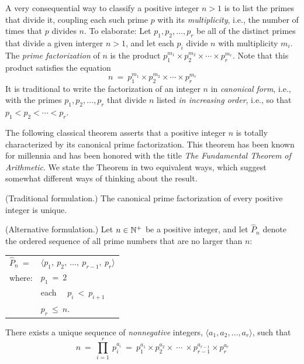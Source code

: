 A very consequential way to classify a positive integer $n >1$ is to list the primes that divide it, coupling each such prime $p$ with its {\it multiplicity}, i.e., the number of times that $p$ divides $n$.  To elaborate: Let $p_1, p_2, \ldots, p_r$ be all of the distinct primes that divide a given interger $n >1$, and let each $p_i$ divide $n$ with multiplicity $m_i$.  The {\it prime factorization} of $n$ is the product $p_1^{m_1} \times p_2^{m_2} \times \cdots \times p_r^{m_r}$.  Note that this product satisfies the equation
\begin{equation}
\label{eq:prime-factorization}
n \ = \ p_1^{m_1} \times p_2^{m_2} \times \cdots \times p_r^{m_r}
\end{equation}
It is traditional to write the factorization of an integer $n$ in {\it canonical form}, i.e., with the primes $p_1, p_2, \ldots, p_r$ that divide $n$ listed {\em in increasing order}, i.e., so that $p_1 < p_2 < \cdots < p_r$.

\medskip

The following classical theorem asserts that a positive integer $n$ is totally characterized by its canonical prime factorization.  This theorem has been known for millennia and has been honored with the title {\em The Fundamental Theorem of Arithmetic}.  We state the Theorem in two equivalent ways, which suggest somewhat different ways of thinking about the result.

\begin{theorem}
\label{thm:Fund-Thm-Arith}

\noindent
{\rm (Traditional formulation.)}
%
The canonical prime factorization of every positive integer is unique.

\medskip

\noindent
{\rm (Alternative formulation.)}
%
Let $n \in \mathbb{N}^+$ be a positive integer, and let $\widehat{P}_n$ denote the ordered sequence of all prime numbers that are no larger than $n$:

\smallskip

\begin{tabular}{ll}
$\widehat{P}_n \ =$  & $\langle p_1, \ p_2, \ \ldots, \ p_{r-1}, \ p_r \rangle$ \\
where:               & $p_1 \ = \ 2$ \\
                          & each  \ \ $p_i \ < \ p_{i+1}$ \\
                          & $p_r \ \leq \ n$.
\end{tabular}

\smallskip

\noindent
There exists a unique sequence of {\em nonnegative} integers, $\langle a_1, a_2, \ldots, a_r \rangle$, such that
\[
n \ = \ \prod_{i=1}^r \ p_i^{a_i} \ = \
p_1^{a_1} \times p_2^{a_2} \times \ \cdots \ \times p_{r-1}^{a_{r-1}} \times p_r^{a_r}
\]
\end{theorem}

